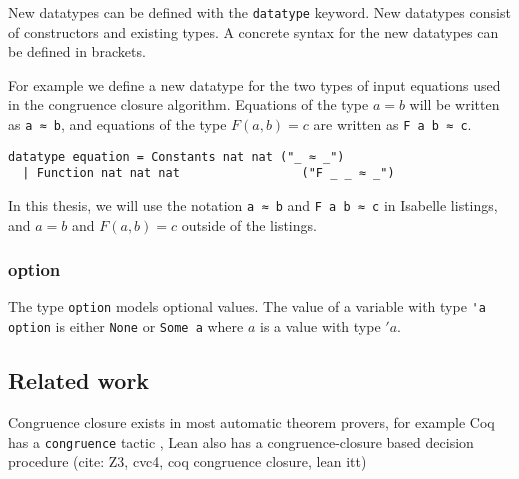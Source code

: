 New datatypes can be defined with the \lstinline|datatype| keyword. New datatypes consist of constructors and existing types. A concrete syntax for the new datatypes can be defined in brackets.

For example we define a new datatype for the two types of input equations used in the congruence closure algorithm. Equations of the type $a = b$ will be written as \lstinline{a ≈ b}, and equations of the type $F(a, b) = c$ are written as \lstinline{F a b ≈ c}.

\begin{lstlisting}
datatype equation = Constants nat nat ("_ ≈ _")
  | Function nat nat nat                 ("F _ _ ≈ _")
\end{lstlisting}

In this thesis, we will use the notation \lstinline{a ≈ b} and \lstinline{F a b ≈ c} in Isabelle listings, and $a = b$ and $F(a, b) = c$ outside of the listings.

\subsubsection{option}

The type \lstinline{option} models optional values. The value of a variable with type \lstinline{'a option} is either \lstinline|None| or \lstinline|Some a| where $a$ is a value with type $'a$.

\subsection{Related work}

Congruence closure exists in most automatic theorem provers, for example Coq has a \lstinline{congruence} tactic \cite{congruence-coq}, Lean also has a congruence-closure based decision procedure \cite{congruenceclosure-lean}
(cite: Z3, cvc4, coq congruence closure, lean itt)

